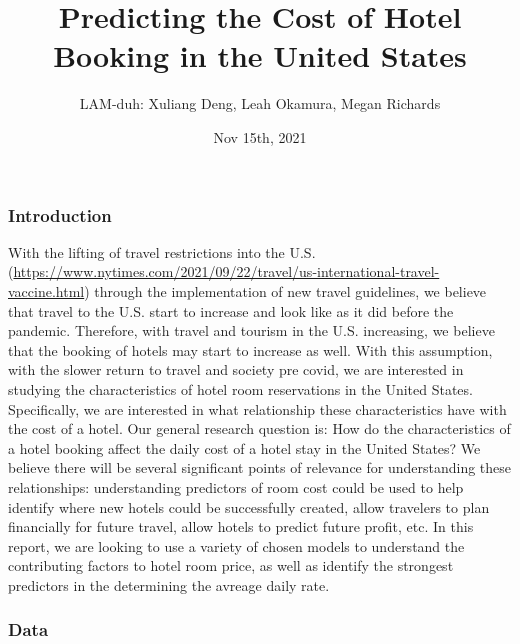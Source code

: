 \documentclass[
]{article}
\title{Predicting the Cost of Hotel Booking in the United States}
\author{LAM-duh: Xuliang Deng, Leah Okamura, Megan Richards}
\date{Nov 15th, 2021}
\begin{document}
\maketitle

\hypertarget{introduction}{%
\subsubsection{Introduction}\label{introduction}}

With the lifting of travel restrictions into the U.S.
(\url{https://www.nytimes.com/2021/09/22/travel/us-international-travel-vaccine.html})
through the implementation of new travel guidelines, we believe that
travel to the U.S. start to increase and look like as it did before the
pandemic. Therefore, with travel and tourism in the U.S. increasing, we
believe that the booking of hotels may start to increase as well. With
this assumption, with the slower return to travel and society pre covid,
we are interested in studying the characteristics of hotel room
reservations in the United States. Specifically, we are interested in
what relationship these characteristics have with the cost of a hotel.
Our general research question is: How do the characteristics of a hotel
booking affect the daily cost of a hotel stay in the United States? We
believe there will be several significant points of relevance for
understanding these relationships: understanding predictors of room cost
could be used to help identify where new hotels could be successfully
created, allow travelers to plan financially for future travel, allow
hotels to predict future profit, etc. In this report, we are looking to
use a variety of chosen models to understand the contributing factors to
hotel room price, as well as identify the strongest predictors in the
determining the avreage daily rate.

\hypertarget{data}{%
\subsubsection{Data}\label{data}}
\end{document}
